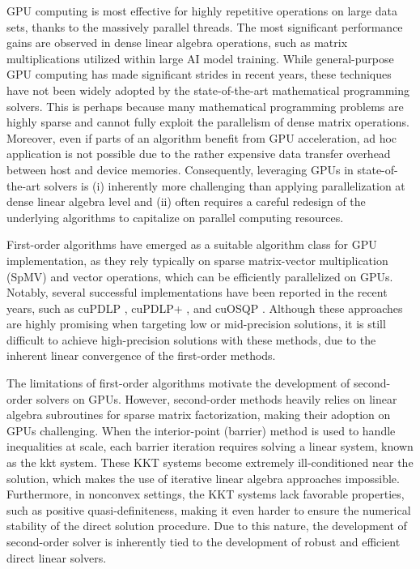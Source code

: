 \documentclass{article}
\begin{document}
GPU computing is most effective for highly repetitive operations on large data sets, thanks to the massively parallel threads.
The most significant performance gains are observed in dense linear algebra operations, such as matrix multiplications utilized within large AI model training.
While general-purpose GPU computing has made significant strides in recent years, these techniques have not been widely adopted by the state-of-the-art mathematical programming solvers.
This is perhaps because many mathematical programming problems are highly sparse and cannot fully exploit the parallelism of dense matrix operations.
Moreover, even if parts of an algorithm benefit from GPU acceleration, ad hoc application is not possible due to the rather expensive data transfer overhead between host and device memories.
Consequently, leveraging GPUs in state-of-the-art solvers is (i) inherently more challenging than applying parallelization at dense linear algebra level and (ii) often requires a careful redesign of the underlying algorithms to capitalize on parallel computing resources.


First-order algorithms have emerged as a suitable algorithm class for GPU implementation, as they rely typically on sparse matrix-vector multiplication (SpMV) and vector operations, which can be efficiently parallelized on GPUs.
Notably, several successful implementations have been reported in the recent years, such as cuPDLP \cite{}, cuPDLP+ \cite{}, and cuOSQP \cite{}.
Although these approaches are highly promising when targeting low or mid-precision solutions, it is still difficult to achieve high-precision solutions with these methods, due to the inherent linear convergence of the first-order methods.

The limitations of first-order algorithms motivate the development of second-order solvers on GPUs.
However, second-order methods heavily relies on linear algebra subroutines for sparse matrix factorization, making their adoption on GPUs challenging.
When the interior-point (barrier) method is used to handle inequalities at scale, each barrier iteration requires solving a linear system, known as the \gls{kkt} system.
These KKT systems become extremely ill-conditioned near the solution, which makes the use of iterative linear algebra approaches impossible.
Furthermore, in nonconvex settings, the KKT systems lack favorable properties, such as positive quasi-definiteness, making it even harder to ensure the numerical stability of the direct solution procedure.
Due to this nature, the development of second-order solver is inherently tied to the development of robust and efficient direct linear solvers.
\end{document}
